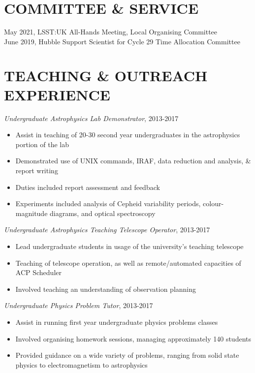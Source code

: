 \documentclass[letter, margin, 10pt]{res} %
\begin{document}
\begin{resume}
\section{COMMITTEE \& SERVICE}

May 2021, LSST:UK All-Hands Meeting, Local Organising Committee\\
June 2019, Hubble Support Scientist for Cycle 29 Time Allocation Committee\\

 \vspace{-6pt}
\section{TEACHING \& OUTREACH EXPERIENCE}

{\sl Undergraduate Astrophysics Lab Demonstrator}, 2013-2017
\begin{itemize}[noitemsep,topsep=0pt,parsep=0pt,partopsep=0pt]
\item Assist in teaching of 20-30 second year undergraduates in the astrophysics portion of the lab
\item Demonstrated use of UNIX commands, IRAF, data reduction and analysis, \& report writing
\item Duties included report assessment and feedback
\item Experiments included analysis of Cepheid variability periods, colour-magnitude diagrams, and optical spectroscopy
\end{itemize}

\vspace{-10pt}

{\sl Undergraduate Astrophysics Teaching Telescope Operator}, 2013-2017
\begin{itemize}[noitemsep,topsep=0pt,parsep=0pt,partopsep=0pt]
\item Lead undergraduate students in usage of the university's teaching telescope
\item Teaching of telescope operation, as well as remote/automated capacities of ACP Scheduler
\item Involved teaching an understanding of observation planning
\end{itemize}

\vspace{-10pt}

{\sl Undergraduate Physics Problem Tutor}, 2013-2017
\begin{itemize}[noitemsep,topsep=0pt,parsep=0pt,partopsep=0pt]
\item Assist in running first year undergraduate physics problems classes
\item Involved organising homework sessions, managing approximately 140 students
\item Provided guidance on a wide variety of problems, ranging from solid state physics to electromagnetism to astrophysics
\end{itemize}


\end{resume}
\end{document}
